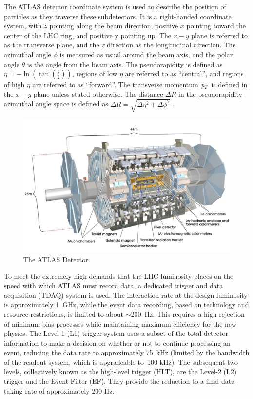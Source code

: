 The ATLAS detector coordinate system is used to describe the position of particles as they traverse these subdetectors. It is a right-handed coordinate system, with $z$ pointing along the beam direction, positive $x$ pointing toward the center of the LHC ring, and positive y pointing up. The $x-y$ plane is referred to as the transverse plane, and the $z$ direction as the longitudinal
direction. The azimuthal angle $\phi$ is measured as usual around the beam axis, and the polar angle $\theta$ is the angle from the beam axis. The pseudorapidity is defined as $\eta = -\ln (\tan (\frac{\theta}{2}))$, regions of low $\eta$ are referred to as ``central'', and regions of high $\eta$ are referred to as ``forward''. %
The transverse momentum ${\emph{p}_{T}}$ is defined in the $x-y$ plane unless stated otherwise. The distance $\Delta R$ in the pseudorapidity-azimuthal angle space is defined as $\Delta R = \sqrt{ \Delta \eta^2  + \Delta \phi^2}$ .


\begin{figure}[htbp]
  \begin{center}
      \includegraphics[angle=90,width=1\textwidth]{Fig2/ATLASDetector.pdf}
    \caption{The ATLAS Detector.}
    \label{fig:ATLAS}
  \end{center}
\end{figure}


To meet the extremely high demands that the LHC luminosity places on the speed with which ATLAS must record data, a dedicated trigger and data acquisition (TDAQ) system is used. The interaction rate at the design luminosity is approximately 1~GHz, while the event data recording, based on technology and resource restrictions, is limited to about $\sim$200~Hz. This requires a high rejection of minimum-bias processes while maintaining maximum efficiency for the new physics. The Level-1 (L1) trigger system uses a
subset of the total detector information to make a decision on whether or not to continue processing an event, reducing the data rate to approximately 75~kHz (limited by the bandwidth of the readout system, which is upgradeable to~100 kHz). The subsequent two levels, collectively known as the high-level trigger (HLT), are the Level-2 (L2) trigger and the Event Filter (EF). They provide the reduction to a final data-taking rate of approximately 200 Hz. 



